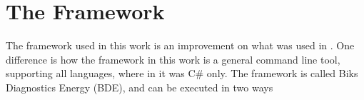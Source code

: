 \section{The Framework}\label{app:framework}

The framework used in this work is an improvement on what was used in \cite{biksbois}. One difference is how the framework in this work is a general command line tool, supporting all languages, where in \cite{biksbois} it was C\# only. The framework is called Biks Diagnostics Energy (BDE), and can be executed in two ways 



